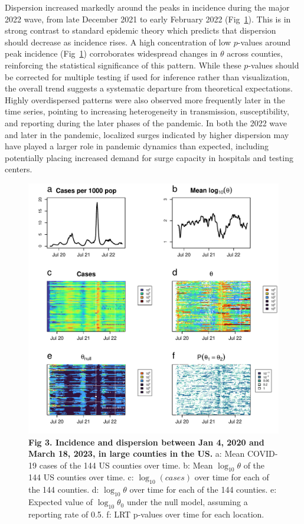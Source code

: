 \documentclass[11pt,letterpaper]{article}
\begin{document}
Dispersion increased markedly around the peaks in incidence during the major 2022 wave, from late December 2021 to early February 2022 (Fig~\ref{fig3}).
This is in strong contrast to standard epidemic theory which predicts that dispersion should decrease as incidence rises.
A high concentration of low $p$-values around peak incidence (Fig~\ref{fig3}) corroborates widespread changes in $\theta$ across counties, reinforcing the statistical significance of this pattern.
While these $p$-values should be corrected for multiple testing if used for inference rather than visualization, the overall trend suggests a systematic departure from theoretical expectations.
Highly overdispersed patterns were also observed more frequently later in the time series, pointing to increasing heterogeneity in transmission, susceptibility, and reporting during the later phases of the pandemic. 
In both the 2022 wave and later in the pandemic, localized surges indicated by higher dispersion may have played a larger role in pandemic dynamics than expected, including potentially placing increased demand for surge capacity in hospitals and testing centers.

\clearpage
\begin{figure}[!ht]
\includegraphics[width=1\textwidth]{fig3}
\caption{{\bf Fig 3. Incidence and dispersion between Jan 4, 2020 and March 18, 2023, in large counties in the US.}
a: Mean COVID-19 cases of the 144 US counties over time. 
b: Mean $\log_{10}\theta$ of the 144 US counties over time.  
c: $\log_{10}(cases)$ over time for each of the 144 counties.
d: $\log_{10}\theta$ over time for each of the 144 counties.
e: Expected value of $\log_{10}\theta_0$ under the null model, assuming a reporting rate of 0.5.
f: LRT p-values over time for each location.}\label{fig3}
\end{figure}
\clearpage
\end{document}
